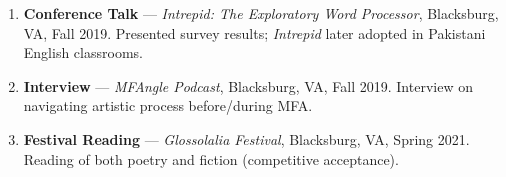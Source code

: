 \begin{enumerate}
\item \textbf{Conference Talk} --- \emph{Intrepid: The Exploratory Word Processor}, Blacksburg, VA, Fall 2019.
\subitem Presented survey results; \emph{Intrepid} later adopted in Pakistani English classrooms.

\item \textbf{Interview} --- \emph{MFAngle Podcast}, Blacksburg, VA, Fall 2019.
\subitem Interview on navigating artistic process before/during MFA.

\item \textbf{Festival Reading} --- \emph{Glossolalia Festival}, Blacksburg, VA, Spring 2021.
\subitem Reading of both poetry and fiction (competitive acceptance).

\end{enumerate}
